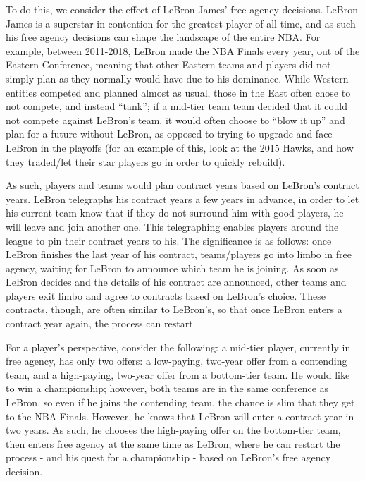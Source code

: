 \documentclass[12pt]{article}
\begin{document}
	To do this, we consider the effect of LeBron James’ free agency decisions. LeBron James is a superstar in contention for the greatest player of all time, and as such his free agency decisions can shape the landscape of the entire NBA. For example, between 2011-2018, LeBron made the NBA Finals every year, out of the Eastern Conference, meaning that other Eastern teams and players did not simply plan as they normally would have due to his dominance. While Western entities competed and planned almost as usual, those in the East often chose to not compete, and instead “tank”; if a mid-tier team team decided that it could not compete against LeBron’s team, it would often choose to “blow it up” and plan for a future without LeBron, as opposed to trying to upgrade and face LeBron in the playoffs (for an example of this, look at the 2015 Hawks, and how they traded/let their star players go in order to quickly rebuild).
	
	As such, players and teams would plan contract years based on LeBron’s contract years. LeBron telegraphs his contract years a few years in advance, in order to let his current team know that if they do not surround him with good players, he will leave and join another one. This telegraphing enables players around the league to pin their contract years to his. The significance is as follows: once LeBron finishes the last year of his contract, teams/players go into limbo in free agency, waiting for LeBron to announce which team he is joining. As soon as LeBron decides and the details of his contract are announced, other teams and players exit limbo and agree to contracts based on LeBron’s choice. These contracts, though, are often similar to LeBron’s, so that once LeBron enters a contract year again, the process can restart. 
	
	For a player’s perspective, consider the following: a mid-tier player, currently in free agency, has only two offers: a low-paying, two-year offer from a contending team, and a high-paying, two-year offer from a bottom-tier team. He would like to win a championship; however, both teams are in the same conference as LeBron, so even if he joins the contending team, the chance is slim that they get to the NBA Finals. However, he knows that LeBron will enter a contract year in two years. As such, he chooses the high-paying offer on the bottom-tier team, then enters free agency at the same time as LeBron, where he can restart the process - and his quest for a championship - based on LeBron’s free agency decision.
	
\end{document}
